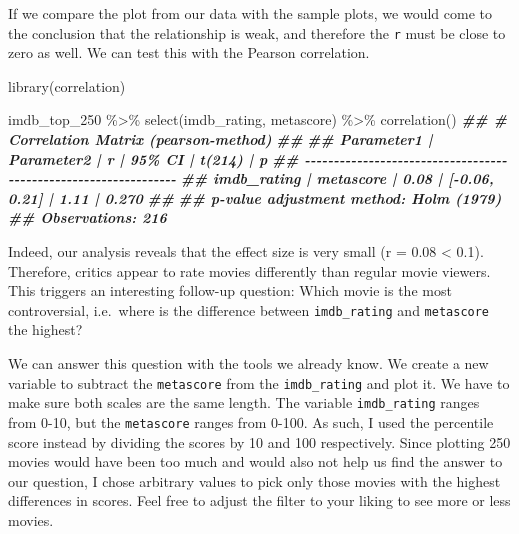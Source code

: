 \documentclass[
]{book}
\newenvironment{Shaded}{\begin{snugshade}}{\end{snugshade}}
\newcommand{\DocumentationTok}[1]{\textcolor[rgb]{0.56,0.35,0.01}{\textbf{\textit{#1}}}}
\newcommand{\FunctionTok}[1]{\textcolor[rgb]{0.00,0.00,0.00}{#1}}
\newcommand{\NormalTok}[1]{#1}
\newcommand{\SpecialCharTok}[1]{\textcolor[rgb]{0.00,0.00,0.00}{#1}}
\begin{document}
If we compare the plot from our data with the sample plots, we would come to the conclusion that the relationship is weak, and therefore the \texttt{r} must be close to zero as well. We can test this with the Pearson correlation.

\begin{Shaded}
\begin{Highlighting}[]
\FunctionTok{library}\NormalTok{(correlation)}

\NormalTok{imdb\_top\_250 }\SpecialCharTok{\%\textgreater{}\%} 
  \FunctionTok{select}\NormalTok{(imdb\_rating, metascore) }\SpecialCharTok{\%\textgreater{}\%} 
  \FunctionTok{correlation}\NormalTok{()}
\DocumentationTok{\#\# \# Correlation Matrix (pearson{-}method)}
\DocumentationTok{\#\# }
\DocumentationTok{\#\# Parameter1  | Parameter2 |    r |        95\% CI | t(214) |     p}
\DocumentationTok{\#\# {-}{-}{-}{-}{-}{-}{-}{-}{-}{-}{-}{-}{-}{-}{-}{-}{-}{-}{-}{-}{-}{-}{-}{-}{-}{-}{-}{-}{-}{-}{-}{-}{-}{-}{-}{-}{-}{-}{-}{-}{-}{-}{-}{-}{-}{-}{-}{-}{-}{-}{-}{-}{-}{-}{-}{-}{-}{-}{-}{-}{-}{-}{-}{-}}
\DocumentationTok{\#\# imdb\_rating |  metascore | 0.08 | [{-}0.06, 0.21] |   1.11 | 0.270}
\DocumentationTok{\#\# }
\DocumentationTok{\#\# p{-}value adjustment method: Holm (1979)}
\DocumentationTok{\#\# Observations: 216}
\end{Highlighting}
\end{Shaded}

Indeed, our analysis reveals that the effect size is very small (r = 0.08 \textless{} 0.1). Therefore, critics appear to rate movies differently than regular movie viewers. This triggers an interesting follow-up question: Which movie is the most controversial, i.e.~where is the difference between \texttt{imdb\_rating} and \texttt{metascore} the highest?

We can answer this question with the tools we already know. We create a new variable to subtract the \texttt{metascore} from the \texttt{imdb\_rating} and plot it. We have to make sure both scales are the same length. The variable \texttt{imdb\_rating} ranges from 0-10, but the \texttt{metascore} ranges from 0-100. As such, I used the percentile score instead by dividing the scores by 10 and 100 respectively. Since plotting 250 movies would have been too much and would also not help us find the answer to our question, I chose arbitrary values to pick only those movies with the highest differences in scores. Feel free to adjust the filter to your liking to see more or less movies.
\end{document}
